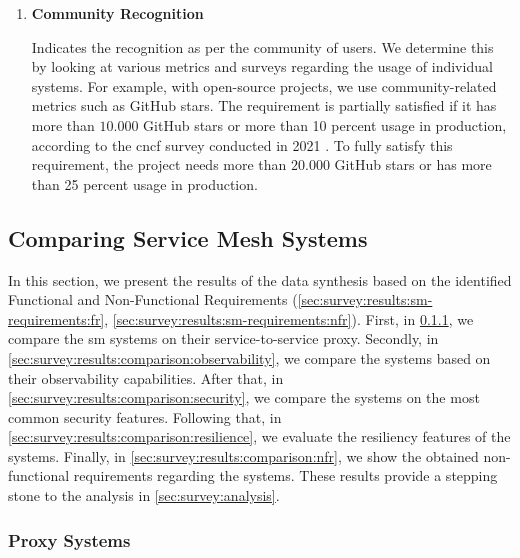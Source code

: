 \begin{enumerate}[label=\textbf{NFR\arabic*}, leftmargin=3\parindent]
    \item \textbf{Community Recognition}
    \label{nfr-5}
    
    Indicates the recognition as per the community of users. We determine this by looking at various metrics and surveys regarding the usage of individual systems. For example, with open-source projects, we use community-related metrics such as GitHub stars. The requirement is partially satisfied if it has more than $10.000$ GitHub stars or more than 10 percent usage in production, according to the \gls{cncf} survey conducted in 2021 \cite{cncf-survey-2021}. To fully satisfy this requirement, the project needs more than $20.000$ GitHub stars or has more than 25 percent usage in production. 
\end{enumerate}



\subsection{Comparing Service Mesh Systems}
\label{sec:survey:results:comparison}

In this section, we present the results of the data synthesis based on the identified Functional and Non-Functional Requirements (\cref{sec:survey:results:sm-requirements:fr}, \cref{sec:survey:results:sm-requirements:nfr}). First, in \cref{sec:survey:results:comparison:proxy}, we compare the \gls{sm} systems on their service-to-service proxy. Secondly, in \cref{sec:survey:results:comparison:observability}, we compare the systems based on their observability capabilities. After that, in \cref{sec:survey:results:comparison:security}, we compare the systems on the most common security features. Following that, in \cref{sec:survey:results:comparison:resilience}, we evaluate the resiliency features of the systems. Finally, in \cref{sec:survey:results:comparison:nfr}, we show the obtained non-functional requirements regarding the systems. These results provide a stepping stone to the analysis in \cref{sec:survey:analysis}.

\subsubsection{Proxy Systems}
\label{sec:survey:results:comparison:proxy}



